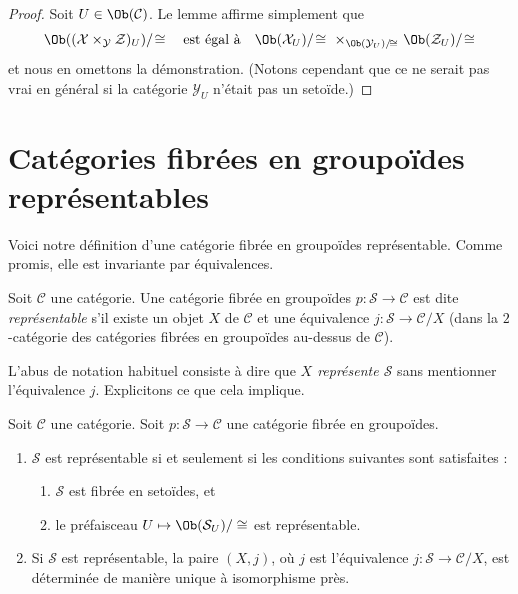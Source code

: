 \begin{proof}
Soit $U \in \Ob(\mathcal{C})$. Le lemme affirme simplement que
$$
\Ob((\mathcal{X} \times_\mathcal{Y} \mathcal{Z})_U)/\!\cong
\quad \text{est égal à} \quad
\Ob(\mathcal{X}_U)/\!\cong
\ \times_{\Ob(\mathcal{Y}_U)/\!\cong}
\ \Ob(\mathcal{Z}_U)/\!\cong
$$
et nous en omettons la démonstration. (Notons cependant que ce ne serait pas
vrai en général si la catégorie $\mathcal{Y}_U$ n'était pas un setoïde.)
\end{proof}










\section{Catégories fibrées en groupoïdes représentables}
\label{section-representable-fibred-groupoids}

\noindent
Voici notre définition d'une catégorie fibrée en groupoïdes représentable.
Comme promis, elle est invariante par équivalences.

\begin{definition}
\label{definition-representable-fibred-category}
Soit $\mathcal{C}$ une catégorie.
Une catégorie fibrée en groupoïdes $p : \mathcal{S} \to \mathcal{C}$ est dite
{\it représentable} s'il existe un objet
$X$ de $\mathcal{C}$ et une équivalence $j : \mathcal{S} \to \mathcal{C}/X$
(dans la $2$-catégorie des catégories fibrées en groupoïdes au-dessus de
$\mathcal{C}$).
\end{definition}

\noindent
L'abus de notation habituel consiste à dire que
{\it $X$ représente $\mathcal{S}$} sans mentionner l'équivalence $j$.
Explicitons ce que cela implique.

\begin{lemma}
\label{lemma-characterize-representable-fibred-category}
Soit $\mathcal{C}$ une catégorie.
Soit $p : \mathcal{S} \to \mathcal{C}$ une catégorie fibrée en groupoïdes.
\begin{enumerate}
\item $\mathcal{S}$ est représentable si et seulement si
les conditions suivantes sont satisfaites :
\begin{enumerate}
\item $\mathcal{S}$ est fibrée en setoïdes, et
\item le préfaisceau $U \mapsto \Ob(\mathcal{S}_U)/\cong$ est
représentable.
\end{enumerate}
\item Si $\mathcal{S}$ est représentable, la paire $(X, j)$, où $j$ est
l'équivalence $j : \mathcal{S} \to \mathcal{C}/X$, est déterminée de manière
unique à isomorphisme près.
\end{enumerate}
\end{lemma}

